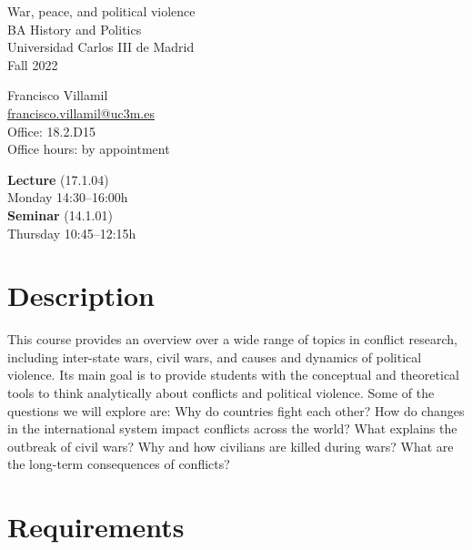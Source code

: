 \documentclass[12pt, a4paper]{article}
\begin{document}
\begin{center}
{\LARGE War, peace, and political violence}\\\vspace{10pt}
BA History and Politics\\
Universidad Carlos III de Madrid\\\vspace{10pt}
{\large Fall 2022}\\
\end{center}

\vspace{20pt}

\begin{minipage}{0.49\textwidth}
\centering
Francisco Villamil\\
\href{francisco.villamil@uc3m.es}{francisco.villamil@uc3m.es}\\
Office: 18.2.D15\\
Office hours: by appointment
\end{minipage}\hfill
\begin{minipage}{0.49\textwidth}
\centering
\textbf{Lecture} (17.1.04)\\Monday 14:30--16:00h\\\vspace{5pt}
\textbf{Seminar} (14.1.01)\\Thursday 10:45--12:15h\\
\end{minipage}


\vspace{10pt}
\section{Description}

This course provides an overview over a wide range of topics in conflict research, including inter-state wars, civil wars, and causes and dynamics of political violence.
Its main goal is to provide students with the conceptual and theoretical tools to think analytically about conflicts and political violence. Some of the questions we will explore are: Why do countries fight each other? How do changes in the international system impact conflicts across the world? What explains the outbreak of civil wars? Why and how civilians are killed during wars? What are the long-term consequences of conflicts?

\section{Requirements}
\end{document}
